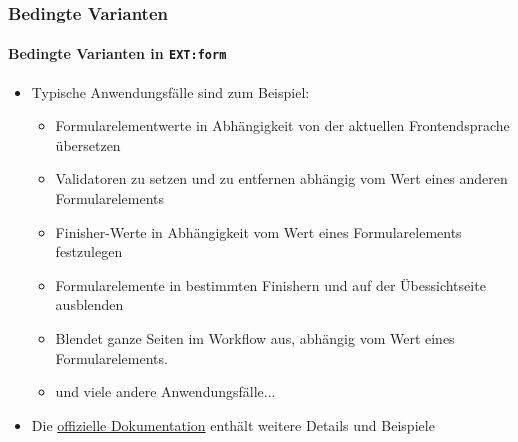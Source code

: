 \begin{frame}[fragile]
	\frametitle{Bedingte Varianten}
	\framesubtitle{Bedingte Varianten in \texttt{EXT:form}}

	\begin{itemize}
		\item Typische Anwendungsfälle sind zum Beispiel:

			\begin{itemize}
				\item Formularelementwerte in Abhängigkeit von der aktuellen 
					Frontendsprache übersetzen
				\item Validatoren zu setzen und zu entfernen abhängig vom Wert eines anderen
					Formularelements
				\item Finisher-Werte in Abhängigkeit vom Wert eines Formularelements festzulegen
				\item Formularelemente in bestimmten Finishern und auf der Übessichtseite ausblenden
				\item Blendet ganze Seiten im Workflow aus, abhängig vom Wert eines 
					Formularelements.
				\item und viele andere Anwendungsfälle...
			\end{itemize}

		\item Die \href{https://docs.typo3.org/typo3cms/extensions/form}{offizielle Dokumentation}
			enthält weitere Details und Beispiele

	\end{itemize}

\end{frame}

